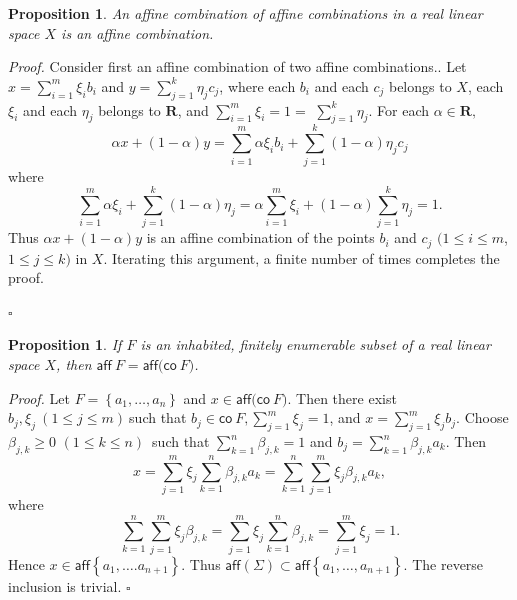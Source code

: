 \documentclass[11pt]{article}%
\newtheorem{proposition}[theorem]{Proposition}
\newenvironment{proof}[1][Proof]{\noindent\textit{#1.} }{}
\begin{document}
\begin{proposition}
\label{2507pr1}An affine combination of affine combinations in a real linear
space $X$ is an affine combination.
\end{proposition}

\begin{proof}
Consider first an affine combination of two affine combinations.. Let
$x=\sum_{i=1}^{m}\xi_{i}b_{i}$ and $y=\sum_{j=1}^{k}\eta_{j}c_{j}$, where each
$b_{i}$ and each $c_{j}$ belongs to $X$, each $\xi_{i}$ and each $\eta_{j}$
belongs to $\mathbf{R}$, and $\sum_{i=1}^{m}\xi_{i}=1=$ $\sum_{j=1}^{k}%
\eta_{j}$. For each $\alpha\in\mathbf{R},$%
\[
\alpha x+\left(  1-\alpha\right)  y=\sum_{i=1}^{m}\alpha\xi_{i}b_{i}%
+\sum_{j=1}^{k}\left(  1-\alpha\right)  \eta_{j}c_{j}%
\]
where%
\[
\sum_{i=1}^{m}\alpha\xi_{i}+\sum_{j=1}^{k}\left(  1-\alpha\right)  \eta
_{j}=\alpha\sum_{i=1}^{m}\xi_{i}+\left(  1-\alpha\right)  \sum_{j=1}^{k}%
\eta_{j}=1.
\]
Thus $\alpha x+\left(  1-\alpha\right)  y$ is an affine combination of the
points $b_{i}$ and $c_{j}$ $(1\leq i\leq m$, $1\leq j\leq k)$ in $X$.
Iterating this argument, a finite number of times completes the proof.%

\hfill
$\square$
\end{proof}

\begin{proposition}
\label{jul22p1}If $F$ is an inhabited, finitely enumerable subset of a real
linear space $X$, then $\mathsf{aff\ }F=\mathsf{aff(co}\ F)$.
\end{proposition}

\begin{proof}
Let $F=\left\{  a_{1},\ldots,a_{n}\right\}  $ and $x\in\mathsf{aff(co}\ F)$.
Then there exist $b_{j},\xi_{j}\ (1\leq j\leq m)\ $such that $b_{j}%
\in\mathsf{co\ }F,\sum_{j=1}^{m}\xi_{j}=1$, and $x=\sum_{j=1}^{m}\xi_{j}b_{j}%
$. Choose $\beta_{j,k}\geq0$ $\left(  1\leq k\leq n\right)  $\ such that
$\sum_{k=1}^{n}\beta_{j,k}=1$ and $b_{j}=\sum_{k=1}^{n}\beta_{j,k}a_{k}$. Then%
\[
x=\sum_{j=1}^{m}\xi_{j}\sum_{k=1}^{n}\beta_{j,k}a_{k}=\sum_{k=1}^{n}\sum
_{j=1}^{m}\xi_{j}\beta_{j,k}a_{k},
\]
where%
\[
\sum_{k=1}^{n}\sum_{j=1}^{m}\xi_{j}\beta_{j,k}=\sum_{j=1}^{m}\xi_{j}\sum
_{k=1}^{n}\beta_{j,k}=\sum_{j=1}^{m}\xi_{j}=1.
\]
Hence $x\in\mathsf{aff}\left\{  a_{1},\ldots.a_{n+1}\right\}  $. Thus
$\mathsf{aff}(\Sigma)\subset\mathsf{aff}\left\{  a_{1},\ldots,a_{n+1}\right\}
$. The reverse inclusion is trivial.%
\hfill
$\square$
\end{proof}
\end{document}
